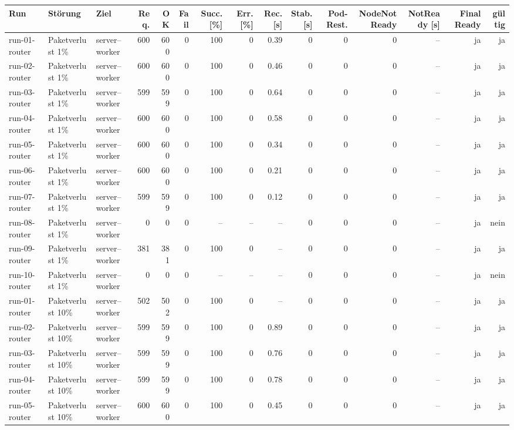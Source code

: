 \begin{table}
\centering
\scriptsize
\setlength{\tabcolsep}{3pt}
\renewcommand{\arraystretch}{1.08}
\begin{tabular}{l l p{3.2cm} r r r r r r r r r r r r}
\toprule
Run & Störung & Ziel & Req. & OK & Fail & Succ. [\%] & Err. [\%] & Rec. [s] & Stab. [s] & Pod-Rest. & NodeNotReady & NotReady [s] & Final Ready & gültig \\
\midrule
run-01-router & Paketverlust 1\% & server--worker & 600 & 600 & 0 & 100 & 0 & 0.39 & 0 & 0 & 0 & -- & ja & ja \\
run-02-router & Paketverlust 1\% & server--worker & 600 & 600 & 0 & 100 & 0 & 0.46 & 0 & 0 & 0 & -- & ja & ja \\
run-03-router & Paketverlust 1\% & server--worker & 599 & 599 & 0 & 100 & 0 & 0.64 & 0 & 0 & 0 & -- & ja & ja \\
run-04-router & Paketverlust 1\% & server--worker & 600 & 600 & 0 & 100 & 0 & 0.58 & 0 & 0 & 0 & -- & ja & ja \\
run-05-router & Paketverlust 1\% & server--worker & 600 & 600 & 0 & 100 & 0 & 0.34 & 0 & 0 & 0 & -- & ja & ja \\
run-06-router & Paketverlust 1\% & server--worker & 600 & 600 & 0 & 100 & 0 & 0.21 & 0 & 0 & 0 & -- & ja & ja \\
run-07-router & Paketverlust 1\% & server--worker & 599 & 599 & 0 & 100 & 0 & 0.12 & 0 & 0 & 0 & -- & ja & ja \\
run-08-router & Paketverlust 1\% & server--worker & 0 & 0 & 0 & -- & -- & -- & 0 & 0 & 0 & -- & ja & nein \\
run-09-router & Paketverlust 1\% & server--worker & 381 & 381 & 0 & 100 & 0 & -- & 0 & 0 & 0 & -- & ja & ja \\
run-10-router & Paketverlust 1\% & server--worker & 0 & 0 & 0 & -- & -- & -- & 0 & 0 & 0 & -- & ja & nein \\
run-01-router & Paketverlust 10\% & server--worker & 502 & 502 & 0 & 100 & 0 & -- & 0 & 0 & 0 & -- & ja & ja \\
run-02-router & Paketverlust 10\% & server--worker & 599 & 599 & 0 & 100 & 0 & 0.89 & 0 & 0 & 0 & -- & ja & ja \\
run-03-router & Paketverlust 10\% & server--worker & 599 & 599 & 0 & 100 & 0 & 0.76 & 0 & 0 & 0 & -- & ja & ja \\
run-04-router & Paketverlust 10\% & server--worker & 599 & 599 & 0 & 100 & 0 & 0.78 & 0 & 0 & 0 & -- & ja & ja \\
run-05-router & Paketverlust 10\% & server--worker & 600 & 600 & 0 & 100 & 0 & 0.45 & 0 & 0 & 0 & -- & ja & ja \\

\end{tabular}
\end{table}
